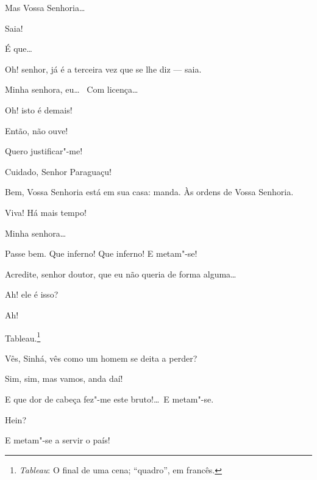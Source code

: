  Mas Vossa Senhoria\ldots

 Saia!

 É que\ldots

 Oh! senhor, já é a terceira vez que se lhe diz --- saia.

 Minha senhora, eu\ldots\  Com licença\ldots

 Oh! isto é demais!

 Então, não ouve!

 Quero justificar"-me!

  Cuidado, Senhor Paraguaçu!

 Bem, Vossa Senhoria está em sua casa: manda.
 Às ordens
de Vossa Senhoria.

 Viva! Há mais tempo! 

 Minha senhora\ldots

 Passe bem.  Que inferno!
Que inferno! E metam"-se!

  Acredite, senhor doutor, que eu não
queria de forma alguma\ldots

  Ah! ele é isso? 

  Ah! 

  Tableau.\footnote{ \textit{Tableau}: O final de uma cena;
``quadro'', em francês.}




 Vês, Sinhá, vês como um homem se deita a perder?

 Sim, sim, mas vamos, anda daí!

  E que dor
de cabeça fez"-me este bruto!\ldots\ E metam"-se.

 Hein?

 E metam"-se a servir o país!

